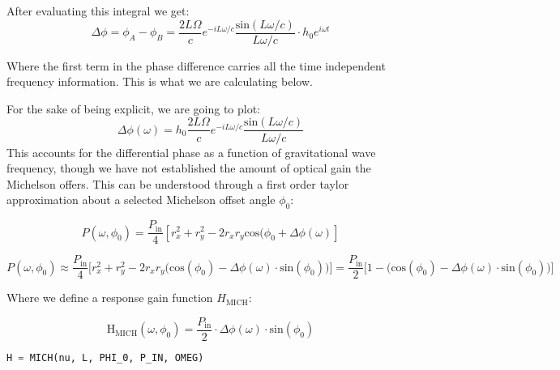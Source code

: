 After evaluating this integral we get: \begin{equation}
\Delta \phi=\phi_A - \phi_B = \frac{2 L \Omega}{c}e^{-i L \omega / c} \frac{\mathrm{sin}(L \omega /c)}{L \omega /c} \cdot h_0 e^{i \omega t}
\end{equation}

Where the first term in the phase difference carries all the time
independent frequency information. This is what we are calculating
below.

For the sake of being explicit, we are going to plot: \begin{equation}
\Delta \phi (\omega) = h_0\frac{2 L \Omega}{c}e^{-i L \omega / c} \frac{\mathrm{sin}(L \omega /c)}{L \omega /c}
\end{equation}This accounts for the differential phase as a function of
gravitational wave frequency, though we have not established the amount
of optical gain the Michelson offers. This can be understood through a
first order taylor approximation about a selected Michelson offset angle
\(\phi_0\):

\begin{equation}P(\omega, \phi_0) =  \frac{P_\mathrm{in}}{4} [r_x^2 + r_y^2 -  2r_x r_y\mathrm{cos}(\phi_0 + \Delta \phi (\omega)] \end{equation}

\begin{equation}P(\omega, \phi_0) \approx  \frac{P_\mathrm{in}}{4} \Big[ r_x^2 + r_y^2 -  2r_x r_y \big(\mathrm{cos}(\phi_0) - \Delta \phi(\omega) \cdot \mathrm{sin}(\phi_0) \big) \Big] =  \frac{P_\mathrm{in}}{2} \Big[1 - \big(\mathrm{cos}(\phi_0) - \Delta \phi(\omega) \cdot \mathrm{sin}(\phi_0) \big) \Big]\end{equation}

Where we define a response gain function \(H_\mathrm{MICH}\):

\begin{equation}\mathrm{H}_\mathrm{MICH}(\omega, \phi_0) =   \frac{P_\mathrm{in}}{2} \cdot \Delta \phi(\omega) \cdot \mathrm{sin}(\phi_0)\end{equation}

\begin{spacing}{1} \begin{lstlisting}[frame=single, language=Python]
H = MICH(nu, L, PHI_0, P_IN, OMEG)
\end{lstlisting} \end{spacing}

